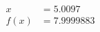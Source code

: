 \documentclass[preview]{standalone}
\begin{document}
\begin{align*}
x &= 5.0097\\f(x) &= 7.9999883
\end{align*}
\end{document}
